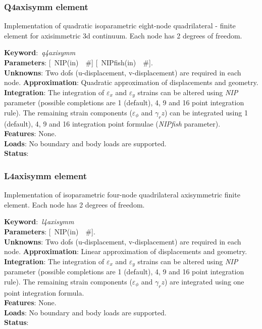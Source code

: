 \documentclass[12pt,dvips]{article}
\newcommand{\descitem}[1]{{\noindent \bf #1}:}
\newcommand{\elemkeyword}[1]{\descitem{Keyword}~{\em #1}}
\newcommand{\elemparam}[2]{{{#1\tiny (#2)}~~\#}}
\newcommand{\optelemparam}[2]{{[~\elemparam{#1}{#2}]}}
\newcommand{\param}[1]{{\it #1}}
\begin{document}
\subsubsection{Q4axisymm element}
Implementation of quadratic isoparametric eight-node quadrilateral -
finite element for axisimmetric 3d continuum. 
Each node has 2 degrees of freedom.

\elemkeyword{q4axisymm}\\
\descitem{Parameters} \optelemparam{NIP}{in} \optelemparam{NIPfish}{in}.\\
\descitem{Unknowns}
Two dofs (u-displacement, v-displacement) are required in each node.
\descitem{Approximation} Quadratic approximation of displacements and
geometry.
\descitem{Integration}
The integration of $\varepsilon_x$ and $\varepsilon_y$ strains can be altered using
\param{NIP} parameter (possible completions are 1 (default), 4, 9 and 16
point integration rule). The remaining strain components ($\varepsilon_\phi$ and
$\gamma_rz$) can be integrated using 1 (default), 4, 9 and 16 integration
point formulae (\param{NIPfish} parameter).\\
\descitem{Features} None.\\
\descitem{Loads} No boundary and body loads are supported.\\
\descitem{Status} 

\subsubsection{L4axisymm element}
Implementation of isoparametric four-node quadrilateral axisymmetric
finite element. Each node has 2 degrees of freedom.

\elemkeyword{l4axisymm}\\
\descitem{Parameters} \optelemparam{NIP}{in}. \\
\descitem{Unknowns}
Two dofs (u-displacement, v-displacement) are required in each node.
\descitem{Approximation} Linear approximation of displacements and
geometry.
\descitem{Integration}
The integration of $\varepsilon_x$ and $\varepsilon_y$ strains can be altered using
\param{NIP} parameter (possible completions are 1 (default), 4, 9 and 16
point integration rule). The remaining strain components ($\varepsilon_\phi$ and
$\gamma_rz$) are integrated using one point integration formula.\\
\descitem{Features} None.\\
\descitem{Loads} No boundary and body loads are supported.\\
\descitem{Status} 
\end{document}
